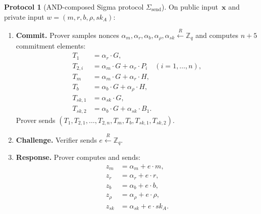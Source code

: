 \documentclass[11pt]{article}
\theoremstyle{definition}
\newtheorem{protocol}[theorem]{Protocol}
\newcommand{\Zq}{\mathbb{Z}_q}
\newcommand{\sk}{\mathit{sk}}
\begin{document}
\begin{protocol}[AND-composed Sigma protocol $\Sigma_{\mathrm{send}}$]
  \label{prot:combined}
  On public input~$\mathbf{x}$ and private input
  $w = (m, r, b, \rho, \sk_A)$:

  \begin{enumerate}
    \item \textbf{Commit.}
          Prover samples nonces
          $\alpha_m, \alpha_r, \alpha_b, \alpha_\rho,
           \alpha_{\sk} \xleftarrow{\;R\;} \Zq$
          and computes $n + 5$ commitment elements:
          \begin{align}
            T_1 &= \alpha_r \cdot G,
              \label{eq:com-t1} \\
            T_{2,i} &= \alpha_m \cdot G + \alpha_r \cdot P_i
              \quad (i = 1, \ldots, n),
              \label{eq:com-t2} \\
            T_m &= \alpha_m \cdot G + \alpha_r \cdot H,
              \label{eq:com-tm} \\
            T_b &= \alpha_b \cdot G + \alpha_\rho \cdot H,
              \label{eq:com-tb} \\
            T_{\sk,1} &= \alpha_{\sk} \cdot G,
              \label{eq:com-tsk1} \\
            T_{\sk,2} &= \alpha_b \cdot G + \alpha_{\sk} \cdot B_1.
              \label{eq:com-tsk2}
          \end{align}
          Prover sends
          $(T_1, T_{2,1}, \ldots, T_{2,n}, T_m, T_b,
            T_{\sk,1}, T_{\sk,2})$.

    \item \textbf{Challenge.}
          Verifier sends $e \xleftarrow{\;R\;} \Zq$.

    \item \textbf{Response.}
          Prover computes and sends:
          \begin{align}
            z_m &= \alpha_m + e \cdot m,
              \label{eq:resp-zm} \\
            z_r &= \alpha_r + e \cdot r,
              \label{eq:resp-zr} \\
            z_b &= \alpha_b + e \cdot b,
              \label{eq:resp-zb} \\
            z_\rho &= \alpha_\rho + e \cdot \rho,
              \label{eq:resp-zrho} \\
            z_{\sk} &= \alpha_{\sk} + e \cdot \sk_A.
              \label{eq:resp-zsk}
          \end{align}


\end{enumerate}
\end{protocol}
\end{document}
